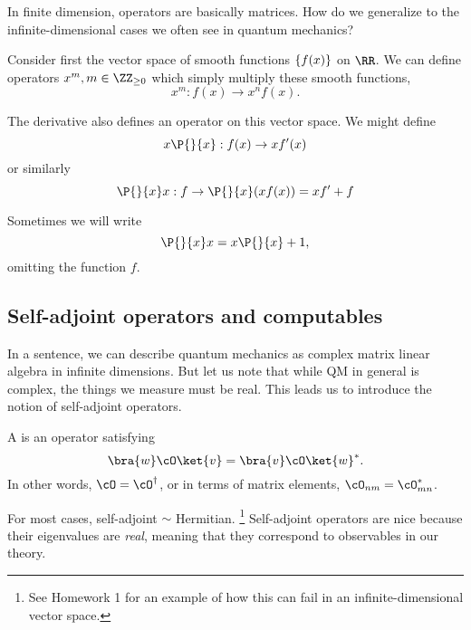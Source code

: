 In finite dimension, operators are basically matrices. How do we generalize to the infinite-dimensional cases we often see in quantum mechanics? 
\begin{exm}
    Consider first the vector space of smooth functions $\{f(x)\}$ on $\RR$. We can define operators $x^m, m\in \ZZ_{\geq 0}$ which simply multiply these smooth functions,
    \begin{equation}
        x^m: f(x) \to x^n f(x).
    \end{equation}
\end{exm}
\begin{exm}
    The derivative also defines an operator on this vector space.
    We might define 
    \begin{equation}
        x\P{}{x}:f(x)\to x f'(x)
    \end{equation}
    or similarly
    \begin{equation}
        \P{}{x} x : f\to \P{}{x}(xf(x))=xf'+f
    \end{equation}
    
    Sometimes we will write
    \begin{equation}
        \P{}{x} x = x\P{}{x}+1,
    \end{equation}
    omitting the function $f$.
\end{exm}

\subsection*{Self-adjoint operators and computables}
In a sentence, we can describe quantum mechanics as complex matrix linear algebra in infinite dimensions. But let us note that while QM in general is complex, the things we measure must be real. This leads us to introduce the notion of self-adjoint operators.
\begin{defn}
    A  is an operator satisfying
    \begin{equation}
        \bra{w} \cO\ket{v} =\bra{v}\cO \ket{w}^*.
    \end{equation}
    In other words, $\cO=\cO^\dagger$, or in terms of matrix elements, $\cO_{nm}=\cO^*_{mn}$.
\end{defn}
For most cases, self-adjoint $\sim$ Hermitian.%
    \footnote{See Homework 1 for an example of how this can fail in an infinite-dimensional vector space.}
Self-adjoint operators are nice because their eigenvalues are \emph{real}, meaning that they correspond to observables in our theory.
    
